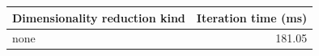 \begin{tabular}{lr}
\toprule
Dimensionality reduction kind & Iteration time (ms) \\
\midrule
none & 181.05 \\
\bottomrule
\end{tabular}
